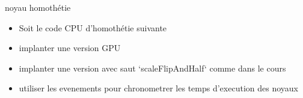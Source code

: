 \documentclass[11pt,mathserif]{beamer}
\begin{document}
\begin{frame}{noyau homothétie}
\begin{itemize}[<+->]
  \item Soit le code CPU d'homothétie suivante

  \item implanter une version GPU
  \item implanter une version avec saut `scaleFlipAndHalf` comme dans le cours
  \item utiliser les evenements pour chronometrer les temps d'execution des noyaux
\end{itemize}
\end{frame}
\end{document}
